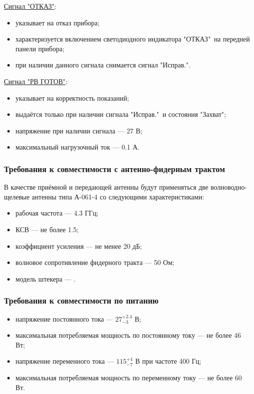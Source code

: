 \documentclass[utf8x, 14pt, oneside, a4paper]{article}
\begin{document}
			\uline{Сигнал "ОТКАЗ"}:
			\begin{itemize}
				\item указывает на отказ прибора;
				\item характеризуется включением светодиодного индикатора "ОТКАЗ"\ на передней панели прибора;
				\item при наличии данного сигнала снимается сигнал "Исправ.".
			\end{itemize}
			
			\uline{Сигнал "РВ ГОТОВ"}:
			\begin{itemize}
				\item указывает на корректность показаний;
				\item выдаётся только при наличии сигнала "Исправ."\ и состояния "Захват";
				\item напряжение при наличии сигнала --- 27 В;
				\item максимальный нагрузочный ток --- 0.1 А.
			\end{itemize}
			
			\subsubsection*{Требования к совместимости с антенно-фидерным трактом}
			В качестве приёмной и передающей антенны будут применяться две волноводно-щелевые антенны типа А-061-4 со следующими характеристиками: 
			\begin{itemize}
				\item рабочая частота --- 4.3 ГГц;
				\item КСВ --- не более 1.5;
				\item коэффициент усиления --- не менее 20 дБ;
				\item волновое сопротивление фидерного тракта --- 50 Ом;
				\item модель штекера --- .
			\end{itemize}
			
			\subsubsection*{Требования к совместимости по питанию}
			\begin{itemize}
				\item напряжение постоянного тока --- $27^{+2.4}_{-3}$ В;
				\item максимальная потребляемая мощность по постоянному току --- не более 46 Вт;
				\item напряжение переменного тока --- $115^{+4}_{-7}$ В при частоте 400 Гц;
				\item максимальная потребляемая мощность по переменному току --- не более 60 Вт.
			\end{itemize}
			
\end{document}
